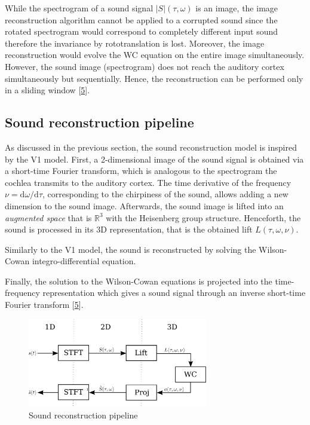 \documentclass[american,]{article}
\theoremstyle{definition}
\theoremstyle{definition}
\theoremstyle{definition}
\theoremstyle{remark}
\begin{document}
While the spectrogram of a sound signal \(\left\lvert S\right\rvert(\tau,\omega)\) is an image,
the image reconstruction algorithm cannot be applied to a corrupted sound
since the rotated spectrogram would correspond to completely different input sound
therefore the invariance by rototranslation is lost.
Moreover, the image reconstruction would evolve the WC equation on the entire
image simultaneously. However, the sound image (spectrogram) does not reach
the auditory cortex simultaneously but sequentially.
Hence, the reconstruction can be performed only in a sliding window {[}\protect\hyperlink{ref-boscain2021}{5}{]}.

\hypertarget{sound-reconstruction-pipeline}{%
\subsection{Sound reconstruction pipeline}\label{sound-reconstruction-pipeline}}

As discussed in the previous section, the sound reconstruction model
is inspired by the V1 model.
First, a 2-dimensional image of the sound signal is obtained via a short-time Fourier transform,
which is analogous to the spectrogram the cochlea transmits to the auditory cortex.
The time derivative of the frequency \(\nu=\mathrm{d}\omega/\mathrm{d}\tau\), corresponding to the chirpiness of the sound,
allows adding a new dimension to the sound image.
Afterwards, the sound image is lifted into an \emph{augmented space} that is \(\mathbb{R}^3\)
with the Heisenberg group structure.
Henceforth, the sound is processed in its 3D representation,
that is the obtained lift \(L(\tau,\omega,\nu)\).

Similarly to the V1 model, the sound is reconstructed by solving
the Wilson-Cowan integro-differential equation.

Finally, the solution to the Wilson-Cowan equations is projected into
the time-frequency representation which gives a sound signal through
an inverse short-time Fourier transform {[}\protect\hyperlink{ref-boscain2021}{5}{]}.

\begin{figure}
\centering
\includegraphics[width=0.7\textwidth,height=\textheight]{img/pipeline.png}
\caption{Sound reconstruction pipeline}
\end{figure}
\end{document}
